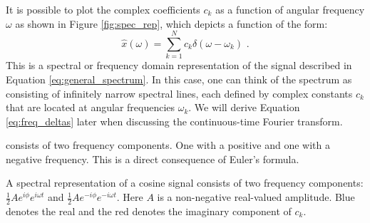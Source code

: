 It is possible to plot the complex coefficients $c_k$ as a function of angular frequency $\omega$ as
shown in Figure \ref{fig:spec_rep}, which depicts a function of the form:
\begin{equation}
  \hat{x}(\omega) = \sum_{k=1}^N c_k \delta(\omega - \omega_k) \,\,.
  \label{eq:freq_deltas}
\end{equation}
This is a spectral or frequency domain representation of the signal described in Equation \ref{eq:general_spectrum}.
In this case, one can think of the spectrum as consisting of infinitely narrow spectral lines,
each defined by complex constants $c_k$ that are located at angular frequencies $\omega_k$.
We will derive Equation \ref{eq:freq_deltas} later when discussing the continuous-time Fourier transform.

 consists of two frequency components.
One with a positive and one with a negative frequency. This is a direct consequence of Euler's formula.

\begin{marginfigure}
  \begin{center}
  \end{center}
  \caption{A spectral representation of a cosine signal consists of two frequency components:
  $\frac{1}{2}Ae^{i\phi}e^{i\omega t}$ and $\frac{1}{2}Ae^{-i\phi}e^{-i\omega t}$.
  Here $A$ is a non-negative real-valued amplitude. Blue denotes the real and the red denotes the imaginary component of $c_k$.}
  \label{fig:exspecsin}
\end{marginfigure}

